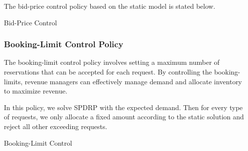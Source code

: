 The bid-price control policy based on the static model is stated below.

\begin{algorithm}[H]
  \caption{Bid-Price Control}\label{algo_bid}
\end{algorithm}


\subsubsection*{Booking-Limit Control Policy}
The booking-limit control policy involves setting a maximum number of reservations that can be accepted for each request. By controlling the booking-limits, revenue managers can effectively manage demand and allocate inventory to maximize revenue.

In this policy, we solve SPDRP with the expected demand. Then for every type of requests, we only allocate a fixed amount according to the static solution and reject all other exceeding requests. 



\begin{algorithm}[H]
  \caption{Booking-Limit Control}\label{algo_booking}
\end{algorithm}


